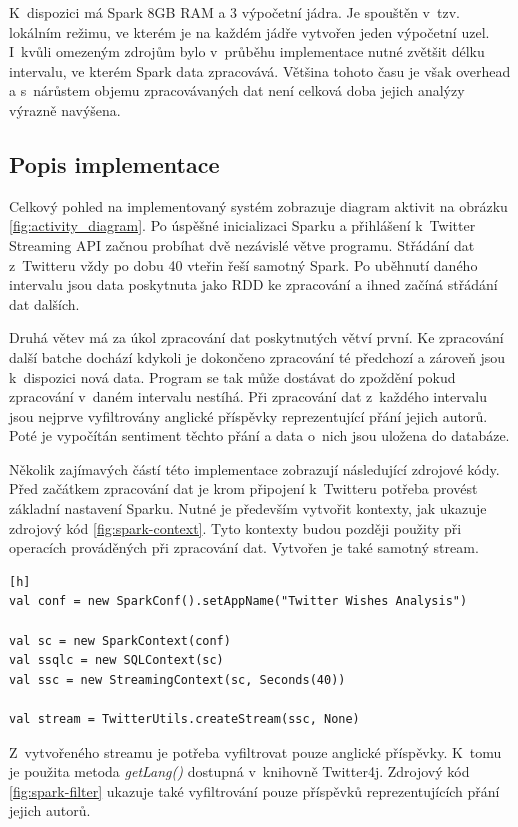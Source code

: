 \documentclass[thesis=B,czech]{FITthesis}[2012/06/26]
\begin{document}
K~dispozici má Spark 8GB RAM a 3 výpočetní jádra. Je spouštěn v~tzv. lokálním režimu, ve kterém je na každém jádře vytvořen jeden výpočetní uzel. I~kvůli omezeným zdrojům bylo v~průběhu implementace nutné zvětšit délku intervalu, ve kterém Spark data zpracovává. Většina tohoto času je však overhead a s~nárůstem objemu zpracovávaných dat není celková doba jejich analýzy výrazně navýšena. 

\subsection{Popis implementace}

Celkový pohled na implementovaný systém zobrazuje diagram aktivit na obrázku \ref{fig:activity_diagram}. Po úspěšné inicializaci Sparku a přihlášení k~Twitter Streaming API začnou probíhat dvě nezávislé větve programu. Střádání dat z~Twitteru vždy po dobu 40 vteřin řeší samotný Spark. Po uběhnutí daného intervalu jsou data poskytnuta jako RDD ke zpracování a ihned začíná střádání dat dalších. 

Druhá větev má za úkol zpracování dat poskytnutých větví první. Ke zpracování další batche dochází kdykoli je dokončeno zpracování té předchozí a zároveň jsou k~dispozici nová data. Program se tak může dostávat do zpoždění pokud zpracování v~daném intervalu nestíhá. Při zpracování dat z~každého intervalu jsou nejprve vyfiltrovány anglické příspěvky reprezentující přání jejich autorů. Poté je vypočítán sentiment těchto přání a data o~nich jsou uložena do databáze. 

Několik zajímavých částí této implementace zobrazují následující zdrojové kódy. Před začátkem zpracování dat je krom připojení k~Twitteru potřeba provést základní nastavení Sparku. Nutné je především vytvořit kontexty, jak ukazuje zdrojový kód \ref{fig:spark-context}. Tyto kontexty budou později použity při operacích prováděných při zpracování dat. Vytvořen je také samotný stream. 


\begin{lstlisting}[caption={Vytvoření kontextů a streamu},label=fig:spark-context][h]
val conf = new SparkConf().setAppName("Twitter Wishes Analysis")

val sc = new SparkContext(conf)
val ssqlc = new SQLContext(sc)
val ssc = new StreamingContext(sc, Seconds(40))

val stream = TwitterUtils.createStream(ssc, None)
\end{lstlisting}

Z~vytvořeného streamu je potřeba vyfiltrovat pouze anglické příspěvky. K~tomu je použita metoda \textit{getLang()} dostupná v~knihovně Twitter4j. Zdrojový kód \ref{fig:spark-filter} ukazuje také vyfiltrování pouze příspěvků reprezentujících přání jejich autorů. 
\end{document}

